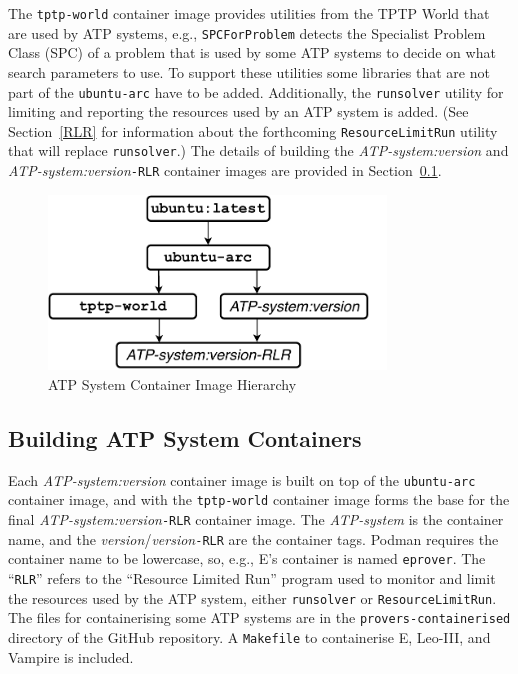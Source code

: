 \documentclass{easychair}
\begin{document}
The {\tt tptp-world} container image provides utilities from the TPTP World that are used by 
ATP systems, e.g., {\tt SPCForProblem} detects the Specialist Problem Class (SPC) \cite{SS01} of 
a problem that is used by some ATP systems to decide on what search parameters to use.
To support these utilities some libraries that are not part of the {\tt ubuntu-arc} have
to be added.
Additionally, the {\tt runsolver} utility for limiting and reporting the resources used by an 
ATP system is added.
(See Section~\ref{RLR} for information about the forthcoming {\tt ResourceLimitRun} utility
that will replace {\tt runsolver}.)
The details of building the {\em ATP-system:version} and {\em ATP-system:version}{\tt -RLR}
container images are provided in Section~\ref{BuildingATPSystemImages}.

\begin{figure}[htb]
\begin{center}
\includegraphics[width=0.8\textwidth]{ImageDAG} 
\caption{ATP System Container Image Hierarchy}
\label{ImageDAG}
\end{center}
\end{figure}

\subsection{Building ATP System Containers}
\label{BuildingATPSystemImages}

Each {\em ATP-system:version} container image is built on top of the {\tt ubuntu-arc} container 
image, and with the {\tt tptp-world} container image forms the base for the final 
{\em ATP-system:version}{\tt -RLR} container image.
The {\em ATP-system} is the container name, and the {\em version}/{\em version}{\tt -RLR} are 
the container tags.
Podman requires the container name to be lowercase, so, e.g., E's container is named {\tt eprover}.
The ``{\tt RLR}'' refers to the ``Resource Limited Run'' program used to monitor and limit the 
resources used by the ATP system, either {\tt runsolver} or {\tt ResourceLimitRun}.
The files for containerising some ATP systems are in the {\tt provers-containerised} directory 
of the GitHub repository.
A {\tt Makefile} to containerise E, Leo-III, and Vampire is included.
\end{document}
